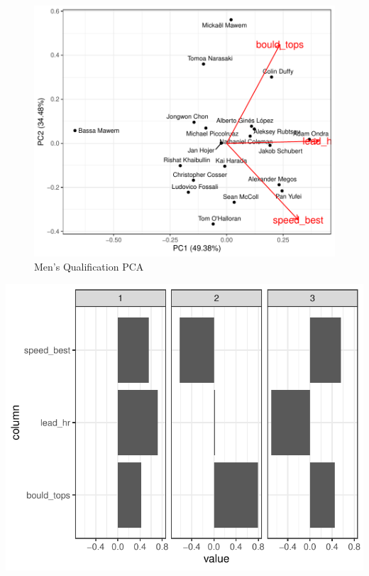 \documentclass[12pt]{article}
\begin{document}
\begin{figure}

{\centering \includegraphics{draft_files/figure-latex/unnamed-chunk-22-1} 

}

\caption{Men's Qualification PCA}\label{fig:unnamed-chunk-22}
\end{figure}

\begin{center}\includegraphics{draft_files/figure-latex/unnamed-chunk-23-1} \end{center}
\end{document}
